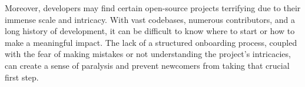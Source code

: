 Moreover, developers may find certain open-source projects terrifying due to their immense scale and intricacy. With vast codebases, numerous contributors, and a long history of development, it can be difficult to know where to start or how to make a meaningful impact. The lack of a structured onboarding process, coupled with the fear of making mistakes or not understanding the project's intricacies, can create a sense of paralysis and prevent newcomers from taking that crucial first step.



\clearpage